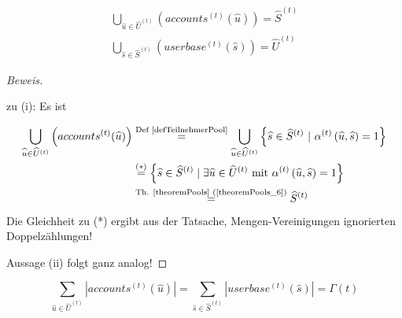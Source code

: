 \begin{Lemma}\label{lemmaPools}

\begin{align}
\bigcup_{\widehat{u} \in \widehat{U}^{(t)}} \left(accounts^{(t)} (\widehat{u})\right) = \widehat{S}^{(t)} \tag{i} \\
\bigcup_{\widehat{s} \in \widehat{S}^{(t)}} \left(userbase^{(t)} (\widehat{s})\right) = \widehat{U}^{(t)} \tag{ii}
\end{align}

\end{Lemma}

\vspace{0.3cm}

\begin{proof}[Beweis] \textrm{ }

\vspace{0.3cm}

zu (i): Es ist

\begin{align*}
\bigcup_{\widehat{u} \in \widehat{U}^{(t)}} \left(accounts^{(t)} (\widehat{u})\right) &\overset{\text{Def \ref{defTeilnehmerPool}}}{=} \bigcup_{\widehat{u} \in \widehat{U}^{(t)}} \left\{\widehat{s} \in \widehat{S}^{(t)} \textrm{ } | \textrm{ } \alpha^{(t)}\left(\widehat{u}, \widehat{s}\right) = 1 \right\} \\
&\overset{(*)}{=} \left\{\widehat{s} \in \widehat{S}^{(t)} \mid \exists \widehat{u} \in \widehat{U}^{(t)} \textrm{ mit } \alpha^{(t)}\left(\widehat{u}, \widehat{s}\right) = 1 \right\} \\
&\overset{\text{Th. \ref{theoremPools} (\ref{theoremPools_6})}}{=} \widehat{S}^{(t)}
\end{align*}
Die Gleichheit zu (*) ergibt aus der Tatsache, Mengen-Vereinigungen ignorierten Doppelzählungen! 

\vspace{0.3cm}

Aussage (ii) folgt ganz analog!

\end{proof}

\vspace{0.3cm}


\begin{Theorem}\label{theremPoolsCount}

\begin{equation*}
\sum_{\widehat{u} \in \widehat{U}^{(t)}} |accounts^{(t)} (\widehat{u})| = \sum_{\widehat{s} \in \widehat{S}^{(t)}} |userbase^{(t)} (\widehat{s})| = \Gamma(t)
\end{equation*}

\end{Theorem}


